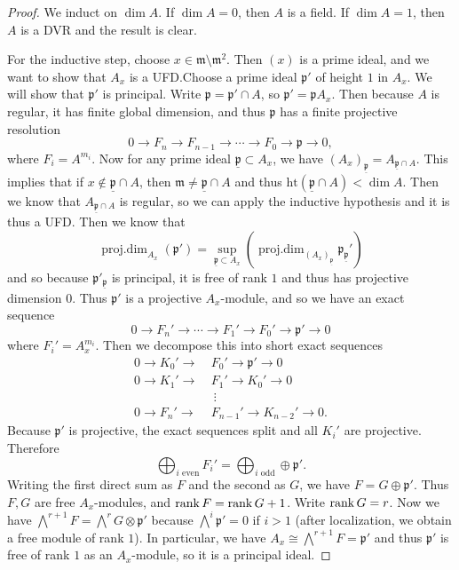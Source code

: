 \documentclass[leqno, openany]{memoir}
\theoremstyle{definition}
\theoremstyle{remark}
\theoremstyle{plain}
\theoremstyle{definition}
\theoremstyle{remark}
\newcommand{\mf}[1]{\mathfrak{#1}}
\newcommand{\mr}[1]{\mathrm{#1}}
\newcommand{\ul}[1]{\underline{#1}}
\DeclareMathOperator{\pdim}{proj.dim}
\begin{document}
\begin{proof}
    We induct on $\dim A$. If $\dim A = 0$, then $A$ is a field. If $\dim A = 1$, then $A$ is a DVR and the result is clear.

    For the inductive step, choose $x \in \mf{m} \setminus \mf{m}^2$. Then $(x)$ is a prime ideal, and we want to show that $A_x$ is a UFD.\@ Choose a prime ideal $\mf{p}'$ of height $1$ in $A_x$. We will show that $\mf{p}'$ is principal. Write $\mf{p} = \mf{p}' \cap A$, so $\mf{p}' = \mf{p} A_x$. Then because $A$ is regular, it has finite global dimension, and thus $\mf{p}$ has a finite projective resolution
    \[ 0 \to F_n \to F_{n-1} \to \cdots \to F_0 \to \mf{p} \to 0, \]
    where $F_i = A^{m_i}$. Now for any prime ideal $\ul{\mf{p}} \subset A_x$, we have ${(A_x)}_{\ul{\mf{p}}} = A_{\ul{\mf{p}} \cap A}$. This implies that if $x \notin \ul{\mf{p}} \cap A$, then $\mf{m} \neq \ul{\mf{p}} \cap A$ and thus $\mr{ht}(\ul{\mf{p}} \cap A) < \dim A$. Then we know that $A_{\ul{\mf{p}} \cap A}$ is regular, so we can apply the inductive hypothesis and it is thus a UFD. Then we know that
    \[ \pdim_{A_x}(\mf{p}') = \sup_{\ul{\mf{p}} \subset A_x} (\pdim_{{(A_x)}_{\ul{\mf{p}}}} \mf{p}_{\ul{\mf{p}}}') \]
    and so because $\mf{p}'_{\ul{\mf{p}}}$ is principal, it is free of rank $1$ and thus has projective dimension $0$. Thus $\mf{p}'$ is a projective $A_x$-module, and so we have an exact sequence
    \[ 0 \to F_n' \to  \cdots \to F_1' \to F_0' \to \mf{p}' \to 0 \]
    where $F_i' = A_x^{m_i}$. Then we decompose this into short exact sequences
    \begin{align*}
        0 \to K_0' \to &\ F_0' \to \mf{p}' \to 0 \\
        0 \to K_1' \to &\ F_1' \to K_0' \to 0 \\
                       &\ \ \vdots \\
        0 \to F_n' \to &\ F_{n-1}' \to K_{n-2}' \to 0.
    \end{align*}
    Because $\mf{p}'$ is projective, the exact sequences split and all $K_i'$ are projective. Therefore
    \[ \bigoplus_{i \text{ even}} F_i' = \bigoplus_{i \text{ odd}} \oplus \mf{p}'. \]
    Writing the first direct sum as $F$ and the second as $G$, we have $F = G \oplus \mf{p}'$. Thus $F,G$ are free $A_x$-modules, and $\rank F = \rank G + 1$. Write $\rank G = r$. Now we have $\bigwedge^{r+1} F = \bigwedge^r G \otimes \mf{p}'$ because $\bigwedge^i \mf{p}' = 0$ if $i > 1$ (after localization, we obtain a free module of rank $1$). In particular, we have $A_x \cong \bigwedge^{r+1} F = \mf{p}'$ and thus $\mf{p}'$ is free of rank $1$ as an $A_x$-module, so it is a principal ideal.
\end{proof}
\end{document}
